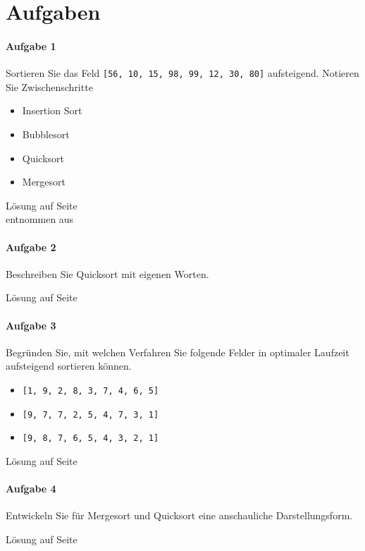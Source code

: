 \documentclass[11pt,a4paper]{scrartcl}
\begin{document}
\section*{Aufgaben}
\paragraph{Aufgabe 1} Sortieren Sie das Feld \texttt{[56, 10, 15, 98, 99, 12, 30, 80]} aufsteigend. Notieren Sie Zwischenschritte
\begin{itemize}
\item Insertion Sort
\item Bubblesort
\item Quicksort
\item Mergesort
\end{itemize}
\begin{flushright}
Lösung auf Seite \pageref{a3.1:lsg} \\
entnommen aus \parencite{GrUeb}
\end{flushright}
\paragraph{Aufgabe 2} 
Beschreiben Sie Quicksort mit eigenen Worten.
\begin{flushright}
Lösung auf Seite \pageref{a3.2:lsg}
\end{flushright}
\paragraph{Aufgabe 3} 
Begründen Sie, mit welchen Verfahren Sie folgende Felder in optimaler Laufzeit aufsteigend sortieren können.
\begin{itemize}
\item \texttt{[1, 9, 2, 8, 3, 7, 4, 6, 5]}
\item \texttt{[9, 7, 7, 2, 5, 4, 7, 3, 1]}
\item \texttt{[9, 8, 7, 6, 5, 4, 3, 2, 1]}
\end{itemize}
\begin{flushright}
Lösung auf Seite \pageref{a3.3:lsg}
\end{flushright}
\paragraph{Aufgabe 4}
Entwickeln Sie für Mergesort und Quicksort eine anschauliche Darstellungsform.
\begin{flushright}
Lösung auf Seite \pageref{a3.4:lsg}
\end{flushright}
\pagebreak
\end{document}
